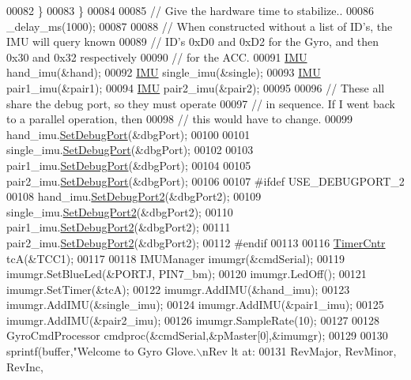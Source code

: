 \begin{DoxyCode}
00082         \}
00083     \}
00084 
00085     \textcolor{comment}{// Give the hardware time to stabilize..}
00086     \_delay\_ms(1000);
00087     
00088     \textcolor{comment}{// When constructed without a list of ID's, the IMU will query known}
00089     \textcolor{comment}{// ID's 0xD0 and 0xD2 for the Gyro, and then 0x30 and 0x32 respectively}
00090     \textcolor{comment}{// for the ACC.}
00091     \hyperlink{class_i_m_u}{IMU}     hand\_imu(&hand);    
00092     \hyperlink{class_i_m_u}{IMU}     single\_imu(&single);
00093     \hyperlink{class_i_m_u}{IMU}     pair1\_imu(&pair1);  
00094     \hyperlink{class_i_m_u}{IMU}     pair2\_imu(&pair2);  
00095 
00096     \textcolor{comment}{// These all share the debug port, so they must operate}
00097     \textcolor{comment}{// in sequence. If I went back to a parallel operation, then}
00098     \textcolor{comment}{// this would have to change.}
00099     hand\_imu.\hyperlink{class_i_m_u_afedf46bdad68cb4002af8bf46530d265}{SetDebugPort}(&dbgPort);
00100 
00101     single\_imu.\hyperlink{class_i_m_u_afedf46bdad68cb4002af8bf46530d265}{SetDebugPort}(&dbgPort);
00102 
00103     pair1\_imu.\hyperlink{class_i_m_u_afedf46bdad68cb4002af8bf46530d265}{SetDebugPort}(&dbgPort);
00104 
00105     pair2\_imu.\hyperlink{class_i_m_u_afedf46bdad68cb4002af8bf46530d265}{SetDebugPort}(&dbgPort);
00106 
00107 \textcolor{preprocessor}{#ifdef USE\_DEBUGPORT\_2}
00108 \textcolor{preprocessor}{}    hand\_imu.\hyperlink{class_i_m_u_a6f86c79e66c4262093c2d65fe3fee45c}{SetDebugPort2}(&dbgPort2);
00109     single\_imu.\hyperlink{class_i_m_u_a6f86c79e66c4262093c2d65fe3fee45c}{SetDebugPort2}(&dbgPort2);
00110     pair1\_imu.\hyperlink{class_i_m_u_a6f86c79e66c4262093c2d65fe3fee45c}{SetDebugPort2}(&dbgPort2);
00111     pair2\_imu.\hyperlink{class_i_m_u_a6f86c79e66c4262093c2d65fe3fee45c}{SetDebugPort2}(&dbgPort2);
00112 \textcolor{preprocessor}{#endif}
00113 \textcolor{preprocessor}{}    
00116     \hyperlink{class_timer_cntr}{TimerCntr}   tcA(&TCC1);
00117     
00118     IMUManager imumgr(&cmdSerial);
00119     imumgr.SetBlueLed(&PORTJ, PIN7\_bm);
00120     imumgr.LedOff();
00121     imumgr.SetTimer(&tcA);
00122     imumgr.AddIMU(&hand\_imu);
00123     imumgr.AddIMU(&single\_imu);
00124     imumgr.AddIMU(&pair1\_imu);
00125     imumgr.AddIMU(&pair2\_imu);
00126     imumgr.SampleRate(10); 
00127     
00128     GyroCmdProcessor cmdproc(&cmdSerial,&pMaster[0],&imumgr);
00129 
00130     sprintf(buffer,\textcolor{stringliteral}{"Welcome to Gyro Glove.\(\backslash\)nRev %
      lt at: %
00131         RevMajor, RevMinor, RevInc,
}
\end{DoxyCode}
